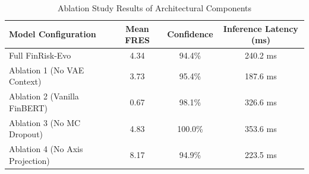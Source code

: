 
\begin{table}[h]
\centering
\caption{Ablation Study Results of Architectural Components}
\label{tab:ablation}
\begin{tabular}{lccc}
\toprule
\textbf{Model Configuration} & \textbf{Mean FRES} & \textbf{Confidence} & \textbf{Inference Latency (ms)} \\
\midrule
Full FinRisk-Evo & 4.34 & 94.4\% & 240.2 ms \\
Ablation 1 (No VAE Context) & 3.73 & 95.4\% & 187.6 ms \\
Ablation 2 (Vanilla FinBERT) & 0.67 & 98.1\% & 326.6 ms \\
Ablation 3 (No MC Dropout) & 4.83 & 100.0\% & 353.6 ms \\
Ablation 4 (No Axis Projection) & 8.17 & 94.9\% & 223.5 ms \\
\bottomrule
\end{tabular}
\end{table}
